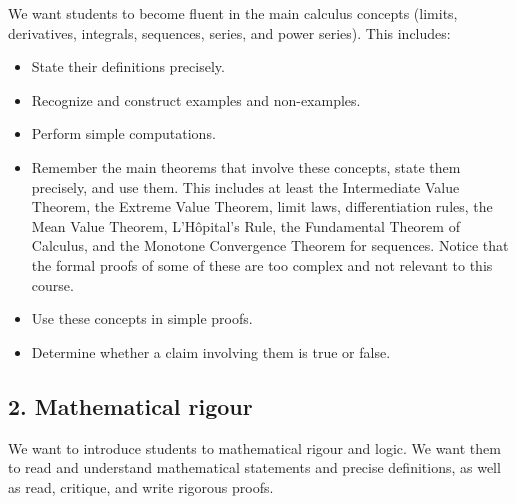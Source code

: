 \documentclass[11pt]{article}
\begin{document}
We want students to become fluent in the main calculus concepts (limits, derivatives, integrals, sequences, series, and power series).  This includes:
	\begin{itemize}
		\item State their definitions precisely.
		\item Recognize and construct examples and non-examples.
		\item Perform simple computations.
		\item Remember the main theorems that involve these concepts, state them precisely, and use them.  This includes at least the Intermediate Value Theorem, the Extreme Value Theorem, limit laws, differentiation rules, the Mean Value Theorem, L'H\^{o}pital's Rule, the Fundamental Theorem of Calculus, and the Monotone Convergence Theorem for sequences.  Notice that the formal proofs of some of these are too complex and not relevant to this course.
		\item Use these concepts in simple proofs. 
		\item Determine whether a claim involving them is true or false.
	\end{itemize}

\subsection{2. Mathematical rigour}\label{CO2}

We want to introduce students to mathematical rigour and logic.   We want them to read and understand mathematical statements and precise definitions, as well as read, critique, and write rigorous proofs.  
\end{document}
